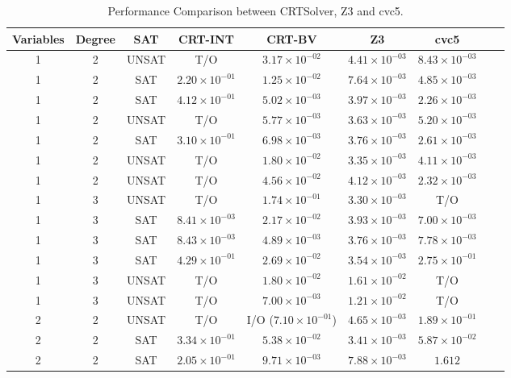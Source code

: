 \begin{table}
  \caption{Performance Comparison between CRTSolver, Z3 and cvc5.}
  \label{table:results}
  \begin{tabular}{ccccccccc}
    \toprule
    Variables & Degree & SAT & CRT-INT & CRT-BV & Z3 & cvc5 \\
    \midrule
1 & 2 & UNSAT & T/O & $3.17 \times 10^{-02}$ & $4.41 \times 10^{-03}$ & $8.43 \times 10^{-03}$ \\
1 & 2 & SAT & $2.20 \times 10^{-01}$ & $1.25 \times 10^{-02}$ & $7.64 \times 10^{-03}$ & $4.85 \times 10^{-03}$ \\
1 & 2 & SAT & $4.12 \times 10^{-01}$ & $5.02 \times 10^{-03}$ & $3.97 \times 10^{-03}$ & $2.26 \times 10^{-03}$ \\
1 & 2 & UNSAT & T/O & $5.77 \times 10^{-03}$ & $3.63 \times 10^{-03}$ & $5.20 \times 10^{-03}$ \\
1 & 2 & SAT & $3.10 \times 10^{-01}$ & $6.98 \times 10^{-03}$ & $3.76 \times 10^{-03}$ & $2.61 \times 10^{-03}$ \\
1 & 2 & UNSAT & T/O & $1.80 \times 10^{-02}$ & $3.35 \times 10^{-03}$ & $4.11 \times 10^{-03}$ \\
1 & 2 & UNSAT & T/O & $4.56 \times 10^{-02}$ & $4.12 \times 10^{-03}$ & $2.32 \times 10^{-03}$ \\
1 & 3 & UNSAT & T/O & $1.74 \times 10^{-01}$ & $3.30 \times 10^{-03}$ & T/O \\
1 & 3 & SAT & $8.41 \times 10^{-03}$ & $2.17 \times 10^{-02}$ & $3.93 \times 10^{-03}$ & $7.00 \times 10^{-03}$ \\
1 & 3 & SAT & $8.43 \times 10^{-03}$ & $4.89 \times 10^{-03}$ & $3.76 \times 10^{-03}$ & $7.78 \times 10^{-03}$ \\
1 & 3 & SAT & $4.29 \times 10^{-01}$ & $2.69 \times 10^{-02}$ & $3.54 \times 10^{-03}$ & $2.75 \times 10^{-01}$ \\
1 & 3 & UNSAT & T/O & $1.80 \times 10^{-02}$ & $1.61 \times 10^{-02}$ & T/O \\
1 & 3 & UNSAT & T/O & $7.00 \times 10^{-03}$ & $1.21 \times 10^{-02}$ & T/O \\
2 & 2 & UNSAT & T/O & I/O ($7.10 \times 10^{-01}$) & $4.65 \times 10^{-03}$ & $1.89 \times 10^{-01}$ \\
2 & 2 & SAT & $3.34 \times 10^{-01}$ & $5.38 \times 10^{-02}$ & $3.41 \times 10^{-03}$ & $5.87 \times 10^{-02}$ \\
2 & 2 & SAT & $2.05 \times 10^{-01}$ & $9.71 \times 10^{-03}$ & $7.88 \times 10^{-03}$ & $1.612$ \\

\end{tabular}
\end{table}
